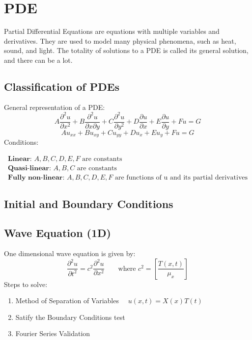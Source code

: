 \section{PDE}
Partial Differential Equations are equations with multiple variables and derivatives.
They are used to model many physical phenomena, such as heat, sound, and light.
The totality of solutions to a PDE is called its general solution, and there can be a lot.

\subsection{Classification of PDEs}
General representation of a PDE:
\[
  A\frac{\partial^2u}{\partial x^2}+B\frac{\partial^2u}{\partial x\partial y}+C\frac{\partial^2u}{\partial y^2}+D\frac{\partial u}{\partial x}+E\frac{\partial u}{\partial y}+Fu=G
\]
\[
  Au_{xx}+Bu_{xy}+Cu_{yy}+Du_x+Eu_y+Fu=G
\]
Conditions:

$$\begin{array}{l}
\textbf{Linear: }A,B,C,D,E,F \text{ are constants}\\
\textbf{Quasi-linear: }A,B,C \text{ are constants}\\
\textbf{Fully non-linear: }A,B,C,D,E,F \text{ are functions of u and its partial derivatives}
\end{array}$$



\subsection{Initial and Boundary Conditions}
\subsection{Wave Equation (1D)}
One dimensional wave equation is given by:
\begin{equation}
  \frac{\partial^2 u}{\partial t^2} = c^2 \frac{\partial^2 u}{\partial x^2}\quad\quad\text{where }c^2=\left[\frac{T(x,t)}{\mu_x}\right]
  \label{eq:wave1d}
\end{equation}
Steps to solve:
\begin{enumerate}
  \item Method of Separation of Variables $\quad u(x,t)=X(x)T(t)$
  \item Satify the Boundary Conditions test
  \item Fourier Series Validation

\end{enumerate}
